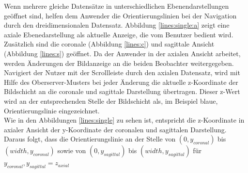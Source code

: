 Wenn mehrere gleiche Datensätze in unterschiedlichen Ebenendarstellungen geöffnet sind, helfen dem Anwender die Orientierungslinien bei der Navigation durch den dreidimensionalen Datensatz. Abbildung \ref{lines:single:a} zeigt eine axiale Ebenedarstellung als aktuelle Anzeige, die vom Benutzer bedient wird. Zusätzlich sind die coronale (Abbildung \ref{lines:c}) und sagittale Ansicht (Abbildung \ref{lines:s}) geöffnet. Da der Anwender in der axialen Ansicht arbeitet, werden Änderungen der Bildanzeige an die beiden Beobachter weitergegeben.\\
Navigiert der Nutzer mit der Scrollleiste durch den axialen Datensatz, wird mit Hilfe des Oberserver-Musters bei jeder Änderung die aktuelle z-Koordinate der Bildschicht an die coronale und sagittale Darstellung übertragen. Dieser z-Wert wird an der entsprechenden Stelle der Bildschicht als, im Beispiel blaue, Orientierungslinie eingezeichnet. \\
Wie in den Abbildungen \ref{lines:single} zu sehen ist, entspricht die z-Koordinate in axialer Ansicht der y-Koordinate der coronalen und sagittalen Darstellung. Daraus folgt, dass die Orientierungslinie an der Stelle von $(0, y_{coronal}) $ bis $(width, y_{coronal})$ sowie von $(0, y_{sagittal}) $ bis $(width, y_{sagittal})$ für $y_{coronal}, y_{sagittal} = z_{axial}$

